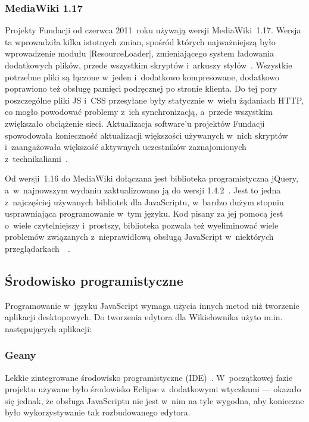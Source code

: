\subsubsection{MediaWiki 1.17}
Projekty Fundacji od czerwca 2011~roku używają wersji MediaWiki~1.17. Wersja ta wprowadziła kilka istotnych zmian, spośród których najważniejszą było wprowadzenie modułu \kod|ResourceLoader|, zmieniającego system ładowania dodatkowych plików, przede wszystkim skryptów i~arkuszy stylów~\cite{mw:117}. Wszystkie potrzebne pliki są łączone w~jeden i~dodatkowo kompresowane, dodatkowo poprawiono też obsługę pamięci podręcznej po stronie klienta. Do tej pory poszczególne pliki JS i~CSS przesyłane były statycznie w~wielu żądaniach HTTP, co mogło powodować problemy z~ich synchronizacją, a~przede wszystkim zwiększało obciążenie sieci. Aktualizacja software'u projektów Fundacji spowodowała konieczność aktualizacji większości używanych w~nich skryptów i~zaangażowała większość aktywnych uczestników zaznajomionych z~technikaliami~\cite{mw:migration}.

Od wersji~1.16 do MediaWiki dołączana jest biblioteka programistyczna jQuery, a~w~najnowszym wydaniu zaktualizowano ją do wersji 1.4.2~\cite{mw:jquery}. Jest to jedna z~najczęściej używanych bibliotek dla JavaScriptu, w~bardzo dużym stopniu usprawniająca programowanie w~tym języku. Kod pisany za jej pomocą jest o~wiele czytelniejszy i~prostszy, biblioteka pozwala też wyeliminować wiele problemów związanych z~nieprawidłową obsługą JavaScript w~niektórych przeglądarkach~\cite{jquery:action}~\cite{jquery:doc}.

\subsection{Środowisko programistyczne}
Programowanie w~języku JavaScript wymaga użycia innych metod niż tworzenie aplikacji desktopowych. Do tworzenia edytora dla Wikisłownika użyto m.in. następujących aplikacji:

\subsubsection{Geany}
Lekkie zintegrowane środowisko programistyczne (IDE)~\cite{geany}. W~początkowej fazie projektu używane było środowisko Eclipse z~dodatkowymi wtyczkami --- okazało się jednak, że obsługa JavaScriptu nie jest w~nim na tyle wygodna, aby konieczne było wykorzystywanie tak rozbudowanego edytora.
